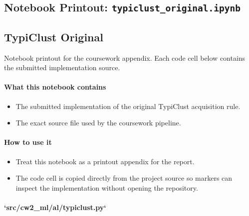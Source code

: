 \subsection*{Notebook Printout: \texttt{typiclust\_original.ipynb}}
\subsection*{TypiClust Original}
Notebook printout for the coursework appendix. Each code cell below contains the submitted implementation source.

\paragraph*{What this notebook contains}
\begin{itemize}
\item The submitted implementation of the original TypiClust acquisition rule.
\item The exact source file used by the coursework pipeline.
\end{itemize}

\paragraph*{How to use it}
\begin{itemize}
\item Treat this notebook as a printout appendix for the report.
\item The code cell is copied directly from the project source so markers can inspect the implementation without opening the repository.
\end{itemize}

\paragraph*{`src/cw2\_ml/al/typiclust.py`}

